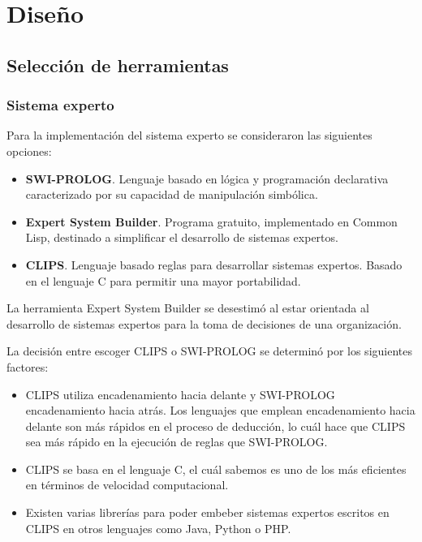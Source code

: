 \chapter{Diseño}

\section{Selección de herramientas}

\subsection{Sistema experto}

Para la implementación del sistema experto se consideraron las siguientes opciones:

\begin{itemize}

	\item \textbf{SWI-PROLOG}. Lenguaje basado en lógica y programación declarativa caracterizado por su capacidad de manipulación simbólica.

	\item \textbf{Expert System Builder}. Programa gratuito, implementado en Common Lisp, destinado a simplificar el desarrollo de sistemas expertos.

	\item \textbf{CLIPS}. Lenguaje basado reglas para desarrollar sistemas expertos. Basado en el lenguaje C para permitir una mayor portabilidad. 

\end{itemize} 

La herramienta Expert System Builder se desestimó al estar orientada al desarrollo de sistemas expertos para la toma de decisiones de una organización. 

La decisión entre escoger CLIPS o SWI-PROLOG se determinó por los siguientes factores:

\begin{itemize}

	\item CLIPS utiliza encadenamiento hacia delante y SWI-PROLOG encadenamiento hacia atrás. Los lenguajes que emplean encadenamiento hacia delante son más rápidos en el proceso de deducción, lo cuál hace que CLIPS sea más rápido en la ejecución de reglas que SWI-PROLOG.

	\item CLIPS se basa en el lenguaje C, el cuál sabemos es uno de los más eficientes en términos de velocidad computacional.

	\item Existen varias librerías para poder embeber sistemas expertos escritos en CLIPS en otros lenguajes como Java, Python o PHP.

\end{itemize} 

